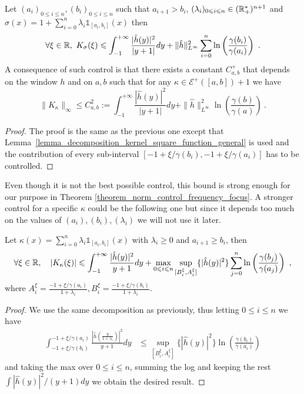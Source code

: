 \begin{prop}\label{prop_control_norm_kernel_on_stair_function}
	Let $(a_i)_{0\leqslant i \leqslant n},(b_i)_{0\leqslant i \leqslant n}$ such that $a_{i+1}>b_i$, $(\lambda_i)_{0\leqslant i \leqslant n}\in (\mathbb{R}_+^*)^{n+1}$ and $\sigma(x)= 1 + \sum_{i=0}^n \lambda_i\mathds{1}_{[a_i,b_i]}(x)$ then
	\begin{equation}
		\forall \xi \in \R, \ K_{\sigma}(\xi) \leqslant \int_{-1}^{+\infty}\frac{|\hat{h}(y)|^2}{|y+1|}dy + \|\hat{h}\|_{L^\infty}^2\sum_{i=0}^n\ln\left(\frac{\gamma(b_i)}{\gamma(a_i)}\right)\ .
	\end{equation}
	A consequence of such control is that there exists a constant $C^+_{a,b}$ that depends on the window $h$ and on $a,b$ such that for any $\kappa\in \mathcal{E}^+([a,b])+1$ we have
	\begin{equation}
		\|K_\kappa\|_\infty \leqslant C_{a,b}^2 := \int_{-1}^{+\infty}\frac{|\hat{h}(y)|^2}{|y+1|}dy + \|\hat{h}\|_{L^\infty}^2\ln\left(\frac{\gamma(b)}{\gamma(a)}\right)\ .
	\end{equation}
\end{prop}
\begin{proof}
	The proof is the same as the previous one except that Lemma~\ref{lemma_decomposition_kernel_square_function_general} is used and the contribution of every sub-interval $[-1+\xi/\gamma(b_i),-1+\xi/\gamma(a_i)]$ has to be controlled.
\end{proof}

Even though it is not the best possible control, this bound is strong enough for our purpose in Theorem \ref{theorem_norm_control_frequency_focus}. A stronger control for a specific $\kappa$ could be the following one but since it depends too much on the values of $(a_i),(b_i),(\lambda_i)$ we will not use it later.


\begin{prop}\label{prop_norm_control_kernel_stair_function_slighter}
	Let $\kappa(x)=\sum_{i=0}^n \lambda_i \mathds{1}_{[a_i,b_i]}(x)$ with $\lambda_i\geqslant0$ and $a_{i+1}\geqslant b_i$, then
	\begin{equation}
		\forall \xi\in\R,\quad |K_\kappa (\xi) | \leqslant \int_{-1}^{+\infty} \frac{|\hat{h}(y)|^2}{y+1}dy + \max_{0 \leqslant i \leqslant n}\sup_{[B_i^\xi,A_i^\xi]}\{|\hat{h}(y)|^2 \} \sum_{j=0}^n \ln\left( \frac{\gamma(b_j)}{\gamma(a_j)} \right)\ ,
	\end{equation}
	where $A_i^\xi=\frac{-1+\xi / \gamma(a_i)}{1+\lambda_i}, B_i^\xi= \frac{-1+\xi / \gamma(b_i)}{1+\lambda_i}$.
\end{prop}
\begin{proof}
	We use the same decomposition as previously, thus letting $0\leqslant i \leqslant n$ we have
	\begin{align}
		\int_{-1+\xi / \gamma(b_i)}^{-1+\xi / \gamma(a_i)}\frac{|\hat{h}(\tfrac{y}{1+\lambda_i})|^2}{y+1}dy &\leqslant \sup_{[B_i^\xi,A_i^\xi]}\{|\hat{h}(y)|^2\}\ln\left( \frac{\gamma(b_i)}{\gamma(a_i)}  \right)
	\end{align}
	and taking the max over $0\leqslant i \leqslant n$, summing the log and keeping the rest $\int |\hat h(y)|^2/(y+1)dy$ we obtain the desired result.
\end{proof}

